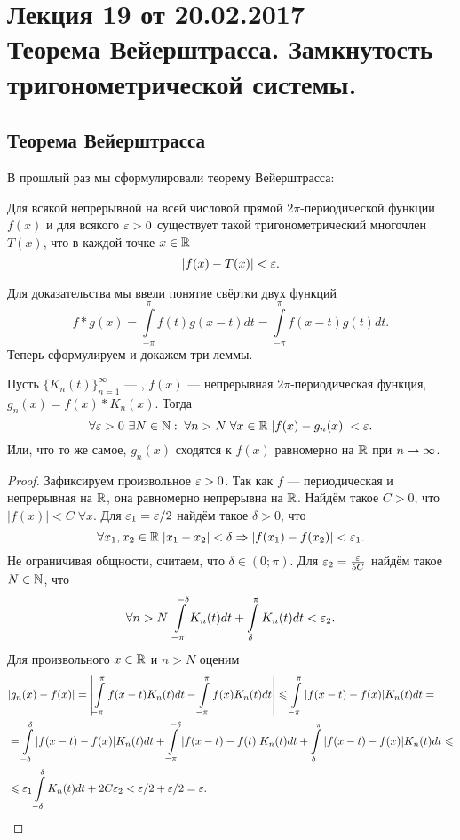 \pagestyle{fancy}
\section{Лекция 19 от 20.02.2017 \\  Теорема Вейерштрасса. Замкнутость тригонометрической системы.}
\subsection{Теорема Вейерштрасса}
В прошлый раз мы сформулировали теорему Вейерштрасса:
\begin{Theorem}
	Для всякой непрерывной на всей числовой прямой $2\pi$-периодической функции $f(x)$ и для всякого $\varepsilon>0$ существует такой тригонометрический многочлен $T(x)$, что в каждой точке $x \in \mathbb{R}$ $$
	 |f(x)-T(x)| < \varepsilon.
	$$
\end{Theorem}
	Для доказательства мы ввели понятие свёртки двух функций
	$$
		f*g(x) = \int\limits_{-\pi}^{\pi} f(t)g(x-t)dt = \int\limits_{-\pi}^{\pi}f(x-t)g(t)dt.
	$$
	Теперь сформулируем и докажем три леммы.
\begin{Lemma}
	Пусть $\{K_n(t)\}_{n=1}^{\infty}$ --- \lmao, $f(x)$ --- непрерывная $2\pi$-периодическая функция, $g_n(x) = f(x)*K_n(x)$. Тогда 
	$$
		\forall \varepsilon>0\ \exists N\in \mathbb{N}:\; \forall n>N\; \forall x\in\mathbb{R}\; |f(x) - g_n(x)| < \varepsilon.
	$$
	Или, что то же самое, $g_n(x)$ сходятся к $f(x)$ равномерно на $\mathbb{R}$ при $n \rightarrow \infty$.
	\begin{proof}
		Зафиксируем произвольное $\varepsilon > 0$. Так как $f$ --- периодическая и непрерывная на $\mathbb{R}$, она равномерно непрерывна на $\mathbb{R}$. Найдём такое $C>0$, что $|f(x)| <C\; \forall x$. Для $\varepsilon_1 = \varepsilon/2$ найдём такое $\delta > 0$, что
		$$
			\forall x_1, x_2\in  \mathbb{R}\; |x_1-x_2| < \delta \Rightarrow |f(x_1) - f(x_2)| < \varepsilon_1.
		$$
		Не ограничивая общности, считаем, что $\delta \in (0; \pi)$.
		Для $\varepsilon_2 = \frac{\varepsilon}{5C}$ найдём такое $N\in \mathbb{N}$, что
		$$
			\forall n>N\; \int\limits_{-\pi}^{-\delta}  K_n(t)dt+ \int\limits_{\delta}^{\pi} K_n(t)dt < \varepsilon_2.
		$$
		Для произвольного $x\in \mathbb{R}$ и $n >N$ оценим
		\begin{align*}
			&|g_n(x) - f(x)|= \left| \int \limits_{-\pi}^{\pi}f(x-t)K_n(t)dt - \int \limits_{-\pi}^{\pi}f(x)K_n(t)dt\right| \leqslant \int \limits_{-\pi}^{\pi}|f(x-t) -f(x)|K_n(t) dt =\\&= \int \limits_{-\delta}^{\delta}|f(x-t) - f(x)|K_n(t)dt + \int \limits_{-\pi}^{-\delta}|f(x-t) - f(t)|K_n(t)dt + \int \limits_{\delta}^{\pi}|f(x-t) - f(x)|K_n(t)dt \leqslant \\ &\leqslant
			\varepsilon_1 \int \limits_{-\delta}^{\delta}K_n(t)dt + 2C\varepsilon_2 < \varepsilon/2 + \varepsilon/2 = \varepsilon.
		\end{align*}
	\end{proof}
\end{Lemma}

